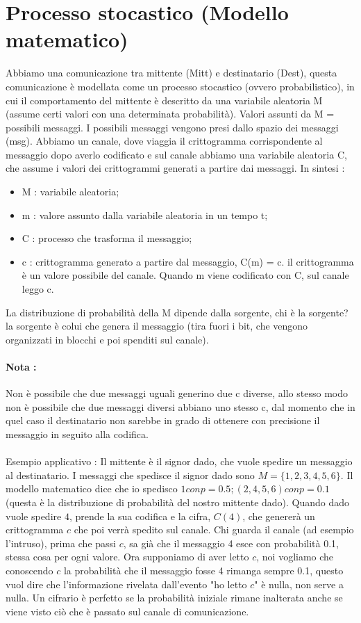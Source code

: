 \section{Processo stocastico (Modello matematico)}
Abbiamo una comunicazione tra mittente (Mitt) e destinatario (Dest), questa comunicazione è modellata come un processo stocastico (ovvero probabilistico), in cui il comportamento del mittente è descritto da una variabile aleatoria M (assume certi valori con una determinata probabilità). Valori assunti da M = possibili messaggi. I possibili messaggi vengono presi dallo spazio dei messaggi (msg). Abbiamo un canale, dove viaggia il crittogramma corrispondente al messaggio dopo averlo codificato e sul canale abbiamo una variabile aleatoria C, che assume i valori dei crittogrammi generati a partire dai messaggi. 
In sintesi : 
\begin{itemize}
	\item M : variabile aleatoria;
	\item m : valore assunto dalla variabile aleatoria in un tempo t;
	\item C : processo che trasforma il messaggio; 
	\item c : crittogramma generato a partire dal messaggio, C(m) = c. il crittogramma è un valore possibile del canale. Quando m viene codificato con C, sul canale leggo c.
\end{itemize}
La distribuzione di probabilità della M dipende dalla sorgente, chi è la sorgente? la sorgente è colui che genera il messaggio (tira fuori i bit, che vengono organizzati in blocchi e poi spenditi sul canale).

\paragraph{Nota :} Non è possibile che due messaggi uguali generino due c diverse, allo stesso modo non è possibile che due messaggi diversi abbiano uno stesso c, dal momento che in quel caso il destinatario non sarebbe in grado di ottenere con precisione il messaggio in seguito alla codifica.\\\\
Esempio applicativo : 
Il mittente è il signor dado, che vuole spedire un messaggio al destinatario. I messaggi che spedisce il signor dado sono $M = \{1, 2, 3, 4, 5, 6\}$. Il modello matematico dice che io spedisco $1 con p = 0.5; (2, 4, 5, 6) con p = 0.1$ (questa è la distribuzione di probabilità del nostro mittente dado). Quando dado vuole spedire $4$, prende la sua codifica e la cifra, $C(4)$, che genererà un crittogramma $c$ che poi verrà spedito sul canale. Chi guarda il canale (ad esempio l'intruso), prima che passi $c$, sa già che il messaggio 4 esce con probabilità 0.1, stessa cosa per ogni valore. Ora supponiamo di aver letto $c$, noi vogliamo che conoscendo $c$ la probabilità che il messaggio fosse 4 rimanga sempre 0.1, questo vuol dire che l'informazione rivelata dall'evento "ho letto $c$" è nulla, non serve a nulla. Un cifrario è perfetto se la probabilità iniziale rimane inalterata anche se viene visto ciò che è passato sul canale di comunicazione.

